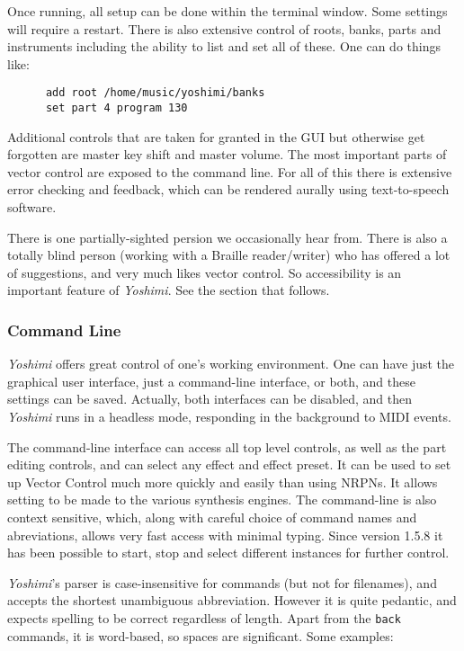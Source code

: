 \documentclass[
 11pt,
 twoside,
 a4paper,
 final                                 %
]{article}
\begin{document}
   Once running, all setup can be done within the terminal window.
   Some settings will require a restart.
   There is also extensive control of
   roots, banks, parts and instruments including the ability to list and set
   all of these. One can do things like:

   \begin{verbatim}
      add root /home/music/yoshimi/banks
      set part 4 program 130
   \end{verbatim}

   Additional controls that are taken for granted in the GUI but
   otherwise get forgotten are master key shift and master volume.  The
   most important parts of vector control are exposed to the command line.
   For all of this there is extensive error checking and feedback, which can be
   rendered aurally using text-to-speech software.

   There is one partially-sighted persion we occasionally hear from. There
   is also a totally blind person (working with a Braille reader/writer) who has
   offered a lot of suggestions, and very much likes vector control.  So
   accessibility  is an important feature of
   \textsl{Yoshimi}.  See the section that follows.

\subsubsection{Command Line}
\label{subsubsec:new_features_command_line}

   \textsl{Yoshimi} offers great control of one's working environment.
   One can have just the graphical user interface, just a command-line
   interface, or both, and these settings can be saved.  Actually, both
   interfaces can be disabled, and then \textsl{Yoshimi} runs in a headless
   mode, responding in the background to MIDI events.

   The command-line interface can access all top level controls, as well as the
   part editing controls, and can select any effect and effect preset.  It can be
   used to set up Vector Control much more quickly and easily than using NRPNs.
   It allows setting to be made to the various synthesis engines.
   The command-line is also context sensitive, which, along with careful choice
   of command names and abreviations, allows very fast access with minimal
   typing. Since version 1.5.8 it has been possible to start, stop and select
   different instances for further control.

   \textsl{Yoshimi}'s parser is case-insensitive for commands (but not for
   filenames), and accepts the shortest unambiguous abbreviation. However it is
   quite pedantic, and expects spelling to be correct regardless of length.
   Apart from the \texttt{back} commands, it is word-based, so spaces are
   significant.
   Some examples:
\end{document}
